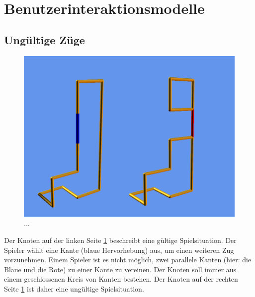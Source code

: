 \section{Benutzerinteraktionsmodelle}

	\begin{figure}[htbp]
	  \centering
	  
	\end{figure}
	
\subsection{Ungültige Züge}

	\begin{figure}[htb]
	  \centering
	  \includegraphics[width = \textwidth]{Systemmodelle/Ungueltiger_Zug.png}
	  \caption{...}
	  \label{fig:zug1}
	\end{figure}

Der Knoten auf der linken Seite \ref{fig:zug1} beschreibt eine gültige Spielsituation. Der Spieler wählt eine Kante (blaue Hervorhebung) aus, um einen weiteren Zug vorzunehmen.
Einem Spieler ist es nicht möglich, zwei parallele Kanten (hier: die Blaue und die Rote) zu einer Kante zu vereinen. Der Knoten soll immer aus einem geschlossenen Kreis von Kanten bestehen. Der Knoten auf der rechten Seite \ref{fig:zug1} ist daher eine ungültige Spielsituation.



